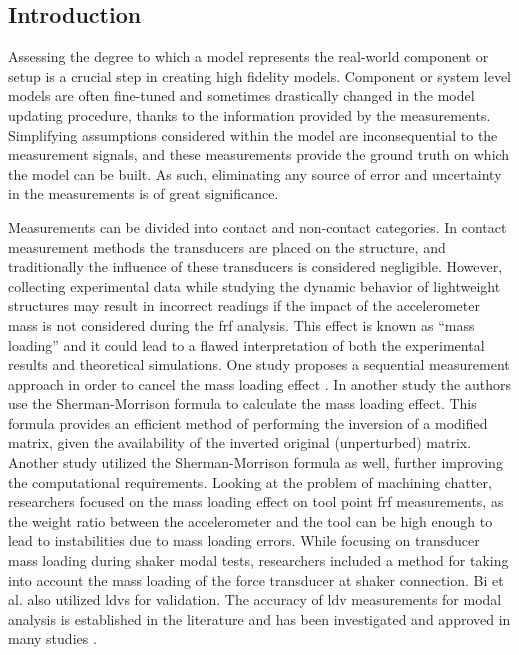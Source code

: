 \subsection{Introduction}

Assessing the degree to which a model represents the real-world component or setup is a crucial step in creating high fidelity models. Component or system level models are often fine-tuned and sometimes drastically changed in the model updating procedure, thanks to the information provided by the measurements. Simplifying assumptions considered within the model are inconsequential to the measurement signals, and these measurements provide the ground truth on which the model can be built. As such, eliminating any source of error and uncertainty in the measurements is of great significance.

Measurements can be divided into contact and non-contact categories. In contact measurement methods the transducers are placed on the structure, and traditionally the influence of these transducers is considered negligible. However, collecting experimental data while studying the dynamic behavior of lightweight structures may result in incorrect readings if the impact of the accelerometer mass is not considered during the \gls{frf} analysis. This effect is known as “mass loading” and it could lead to a flawed interpretation of both the experimental results and theoretical simulations. One study proposes a sequential measurement approach in order to cancel the mass loading effect \cite{silva_cancellation_2000} . In another study \cite{cakar_elimination_2005} the authors use the Sherman-Morrison formula to calculate the mass loading effect. This formula provides an efficient method of performing the inversion of a modified matrix, given the availability of the inverted original (unperturbed) matrix. Another study \cite{zhu_removing_2019} utilized the Sherman-Morrison formula as well, further improving the computational requirements. Looking at the problem of machining chatter, researchers \cite{ozsahin_analysis_2010} focused on the mass loading effect on tool point \gls{frf} measurements, as the weight ratio between the accelerometer and the tool can be high enough to lead to instabilities due to mass loading errors. While focusing on transducer mass loading during shaker modal tests, researchers \cite{bi_elimination_2013} included a method for taking into account the mass loading of the force transducer at shaker connection. Bi et al. also utilized \glspl{ldv} for validation. The accuracy of \gls{ldv} measurements for modal analysis is established in the literature and has been investigated and approved in many studies \cite{warren_comparison_2011}.

